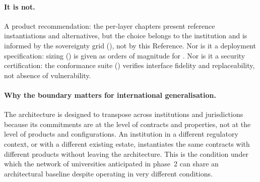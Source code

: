 \paragraph{It is not.} A product recommendation: the per-layer
chapters present reference instantiations and alternatives, but the
choice belongs to the institution and is informed by the sovereignty
grid (), not by this Reference. Nor is
it a deployment specification: sizing
() is given as orders of magnitude for . Nor is it a security certification: the conformance
suite () verifies interface fidelity and
replaceability, not absence of vulnerability.

\paragraph{Why the boundary matters for international
generalisation.} The architecture is designed to transpose across
institutions and jurisdictions because its commitments are at the
level of contracts and properties, not at the level of products and
configurations. An institution in a different regulatory context, or
with a different existing estate, instantiates the same contracts
with different products without leaving the architecture. This is the
condition under which the network of universities anticipated in
phase~2 can share an architectural baseline despite operating in very
different conditions.
